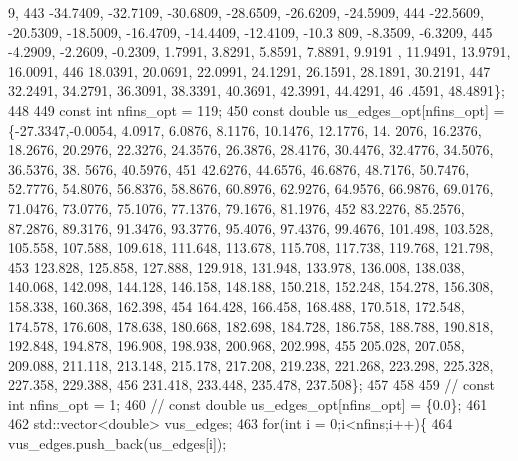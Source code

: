 \begin{DoxyCode}
      9, 
443                                           -34.7409, -32.7109, -30.6809, -28.6509, -26.6209, -24.5909, 
444                                           -22.5609, -20.5309, -18.5009, -16.4709, -14.4409, -12.4109, -10.3
      809, -8.3509, -6.3209, 
445                                           -4.2909, -2.2609, -0.2309, 1.7991, 3.8291, 5.8591, 7.8891, 9.9191
      , 11.9491, 13.9791, 16.0091, 
446                                           18.0391, 20.0691, 22.0991, 24.1291, 26.1591, 28.1891, 30.2191,
447                                           32.2491, 34.2791, 36.3091, 38.3391, 40.3691, 42.3991, 44.4291, 46
      .4591, 48.4891\};
448     
449     \textcolor{keyword}{const} \textcolor{keywordtype}{int} nfins\_opt = 119;
450     \textcolor{keyword}{const} \textcolor{keywordtype}{double} us\_edges\_opt[nfins\_opt] = \{-27.3347,-0.0054, 4.0917, 6.0876, 8.1176, 10.1476, 12.1776, 14.
      2076, 16.2376, 18.2676, 20.2976, 22.3276, 24.3576, 26.3876, 28.4176, 30.4476, 32.4776, 34.5076, 36.5376, 38.
      5676, 40.5976,
451                                             42.6276, 44.6576, 46.6876, 48.7176, 50.7476, 52.7776, 54.8076, 
      56.8376, 58.8676, 60.8976, 62.9276, 64.9576, 66.9876, 69.0176, 71.0476, 73.0776, 75.1076, 77.1376, 79.1676, 
      81.1976,
452                                             83.2276, 85.2576, 87.2876, 89.3176, 91.3476, 93.3776, 95.4076, 
      97.4376, 99.4676, 101.498, 103.528, 105.558, 107.588, 109.618, 111.648, 113.678, 115.708, 117.738, 119.768, 
      121.798,
453                                             123.828, 125.858, 127.888, 129.918, 131.948, 133.978, 136.008, 
      138.038, 140.068, 142.098, 144.128, 146.158, 148.188, 150.218, 152.248, 154.278, 156.308, 158.338, 160.368, 
      162.398,
454                                             164.428, 166.458, 168.488, 170.518, 172.548, 174.578, 176.608, 
      178.638, 180.668, 182.698, 184.728, 186.758, 188.788, 190.818, 192.848, 194.878, 196.908, 198.938, 200.968, 
      202.998,
455                                             205.028, 207.058, 209.088, 211.118, 213.148, 215.178, 217.208, 
      219.238, 221.268, 223.298, 225.328, 227.358, 229.388,
456                                             231.418, 233.448, 235.478, 237.508\};
457     
458 
459    \textcolor{comment}{// const int nfins\_opt = 1;}
460    \textcolor{comment}{// const double us\_edges\_opt[nfins\_opt] = \{0.0\};}
461         
462     std::vector<double> vus\_edges;
463     \textcolor{keywordflow}{for}(\textcolor{keywordtype}{int} i = 0;i<nfins;i++)\{
464       vus\_edges.push\_back(us\_edges[i]);

\end{DoxyCode}
